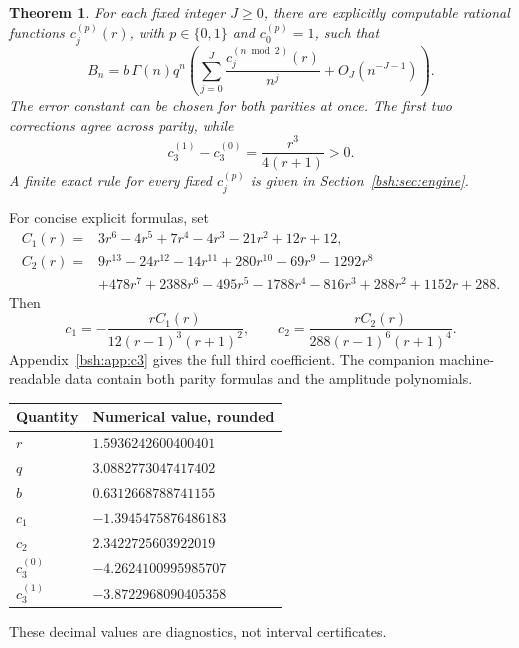 \documentclass[11pt,letterpaper]{article}
\newtheorem{theorem}{Theorem}[section]
\theoremstyle{remark}\newtheorem{remark}[theorem]{Remark}
\begin{document}
\begin{theorem}\label{bsh:thm:main}
For each fixed integer $J\geq0$, there are explicitly computable rational functions $c_j^{(p)}(r)$, with $p\in\{0,1\}$ and $c_0^{(p)}=1$, such that
\begin{equation}\label{bsh:eq:main}
 B_n=b\,\Gamma(n)q^n
 \left(\sum_{j=0}^{J}\frac{c_j^{(n\bmod2)}(r)}{n^j}
       +O_J(n^{-J-1})\right).
\end{equation}
The error constant can be chosen for both parities at once. The first two corrections agree across parity, while
\begin{equation}\label{bsh:eq:parity}
 c_3^{(1)}-c_3^{(0)}=\frac{r^3}{4(r+1)}>0.
\end{equation}
A finite exact rule for every fixed $c_j^{(p)}$ is given in Section~\ref{bsh:sec:engine}.
\end{theorem}

For concise explicit formulas, set
\begin{align*}
 C_1(r)={}&3r^6-4r^5+7r^4-4r^3-21r^2+12r+12,\\
 C_2(r)={}&9r^{13}-24r^{12}-14r^{11}+280r^{10}-69r^9-1292r^8\\
 &+478r^7+2388r^6-495r^5-1788r^4-816r^3+288r^2+1152r+288.
\end{align*}
Then
\begin{equation}\label{bsh:eq:c12}
 c_1=-\frac{rC_1(r)}{12(r-1)^3(r+1)^2},\qquad
 c_2=\frac{rC_2(r)}{288(r-1)^6(r+1)^4}.
\end{equation}
Appendix~\ref{bsh:app:c3} gives the full third coefficient. The companion machine-readable data contain both parity formulas and the amplitude polynomials.

\begin{center}
\begin{tabular}{@{}ll@{}}
\toprule
Quantity & Numerical value, rounded\\\midrule
$r$ & $1.5936242600400401$\\
$q$ & $3.0882773047417402$\\
$b$ & $0.6312668788741155$\\
$c_1$ & $-1.3945475876486183$\\
$c_2$ & $2.3422725603922019$\\
$c_3^{(0)}$ & $-4.2624100995985707$\\
$c_3^{(1)}$ & $-3.8722968090405358$\\\bottomrule
\end{tabular}
\end{center}
These decimal values are diagnostics, not interval certificates.
\end{document}
